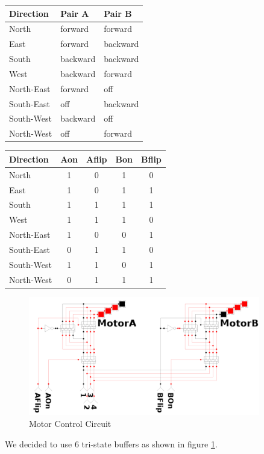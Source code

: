 \begin{center}
	\begin{tabular}{|l|l|l|}
		\hline
		Direction & Pair A & Pair B	\\
		\hline
		North & forward & forward \\
		East 	& forward & backward \\
		South & backward & backward \\
		West 	& backward & forward \\
		\hline
		North-East & forward & off \\
		South-East & off & backward \\
		South-West & backward & off\\
		North-West & off & forward \\
		\hline
	\end{tabular}
	\begin{tabular}{|l|c|c|c|c|}
		\hline
		Direction & Aon & Aflip & Bon & Bflip \\
		\hline
		North & 1 & 0 & 1 & 0 \\
		East 	& 1 & 0 & 1 & 1 \\
		South & 1 & 1 & 1 & 1 \\
		West 	& 1 & 1 & 1 & 0 \\
		\hline
		North-East & 1 & 0 & 0 & 1 \\
		South-East & 0 & 1 & 1 & 0 \\
		South-West & 1 & 1 & 0 & 1 \\
		North-West & 0 & 1 & 1 & 1 \\
		\hline
	\end{tabular}
	\label{table:directions}
\end{center}



\begin{figure}[htp]
	\centering
	\includegraphics[width=0.9\textwidth]{figures/move/direction_choice}
	\caption{Motor Control Circuit}
	\label{fig:mot_ctrl}
\end{figure}

We decided to use 6 tri-state buffers as shown in figure \ref{fig:mot_ctrl}.
